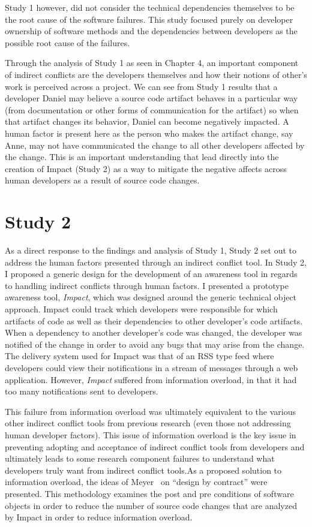 Study 1 however, did not consider the technical dependencies themselves to be the root cause of
the software failures. This study focused purely on developer ownership of software methods and
the dependencies between developers as the possible root cause of the failures.

Through the analysis of Study 1 as seen in Chapter 4, an important component of indirect conflicts are the developers
themselves and how their notions of other's work is perceived across a project. We can see from Study 1 results that
a developer Daniel may believe a source code artifact behaves in a particular way (from documentation or other forms
of communication for the artifact) so when that artifact changes its behavior, Daniel can become negatively impacted.
A human factor is present here as the person who makes the artifact change, say Anne, may not have communicated the
change to all other developers affected by the change. This is an important understanding that lead directly into the
creation of Impact (Study 2) as a way to mitigate the negative affects across human developers as a result of 
source code changes.

\section{Study 2}

As a direct response to the findings and analysis of Study 1, Study 2 set out to address the human factors presented
through an indirect conflict tool. In Study 2, I proposed a generic design for the development of an awareness tool 
in regards to handling indirect conflicts through human factors. I presented a prototype awareness tool, \textit{Impact}, 
which was designed around the generic technical object approach. Impact could track which developers were responsible
for which artifacts of code as well as their dependencies to other developer's code artifacts. When a dependency to
another developer's code was changed, the developer was notified of the change in order to avoid any bugs that
may arise from the change. The delivery system used for Impact was that of an RSS type feed where developers could view
their notifications in a stream of messages through a web application. However, \textit{Impact} suffered from information 
overload, in that it had too many notifications sent to developers.

This failure from information overload was ultimately equivalent to the various other indirect conflict tools from
previous research (even those not addressing human developer factors). This issue of information overload is the key issue 
in preventing adopting and acceptance of indirect conflict tools from developers and ultimately leads to some research
component failures to understand what developers truly want from indirect conflict tools.As a proposed solution to information overload, 
the ideas of Meyer~\cite{Meyer:1988} on ``design by contract'' were presented. This methodology examines the 
post and pre conditions of software objects in order to reduce the number of source code changes that are analyzed by 
Impact in order to reduce information overload.

